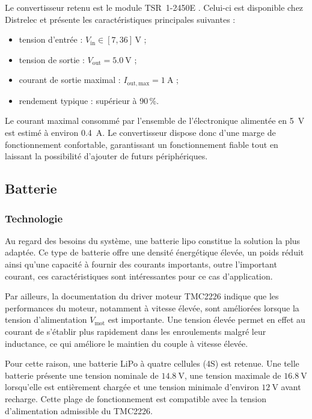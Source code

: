 Le convertisseur retenu est le module TSR~1-2450E \cite{TSR1-2450E}. Celui-ci est disponible chez Distrelec et présente les caractéristiques principales suivantes :

\begin{itemize}
    \item tension d'entrée : $V_{\mathrm{in}} \in [7,36]\,\si{\volt}$ ;
    \item tension de sortie : $V_{\mathrm{out}} = \SI{5.0}{\volt}$ ;
    \item courant de sortie maximal : $I_{\mathrm{out,max}} = \SI{1}{\ampere}$ ;
    \item rendement typique : supérieur à 90\,\%.
\end{itemize}

Le courant maximal consommé par l'ensemble de l'électronique alimentée en \SI{5}{\volt} est estimé à environ \SI{0.4}{\ampere}. Le convertisseur dispose donc d'une marge de fonctionnement confortable, garantissant un fonctionnement fiable tout en laissant la possibilité d'ajouter de futurs périphériques.

\subsection{Batterie}
\subsubsection{Technologie}
\label{subsubsection:technologie}

Au regard des besoins du système, une batterie \gls{lipo} constitue la solution la plus adaptée. Ce type de batterie offre une densité énergétique élevée, un poids réduit ainsi qu'une capacité à fournir des courants importants, outre l'important courant, ces caractéristiques sont intéressantes pour ce cas d'application.

Par ailleurs, la documentation du driver moteur TMC2226 indique que les performances du moteur, notamment à vitesse élevée, sont améliorées lorsque la tension d'alimentation $V_{\mathrm{mot}}$ est importante. Une tension élevée permet en effet au courant de s'établir plus rapidement dans les enroulements malgré leur inductance, ce qui améliore le maintien du couple à vitesse élevée.

Pour cette raison, une batterie LiPo à quatre cellules (4S) est retenue. Une telle batterie présente une tension nominale de $\SI{14.8}{\volt}$, une tension maximale de $\SI{16.8}{\volt}$ lorsqu'elle est entièrement chargée et une tension minimale d'environ $\SI{12}{\volt}$ avant recharge. Cette plage de fonctionnement est compatible avec la tension d'alimentation admissible du TMC2226.

